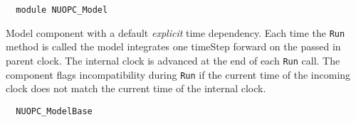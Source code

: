  
\setlength{\parskip}{0pt}
\setlength{\parindent}{0pt}
\setlength{\baselineskip}{11pt}
 
\def\bv{\begin{verbatim}}
\def\ev{\end{verbatim}}
\def\be{\begin{equation}}
\def\ee{\end{equation}}
\def\bea{\begin{eqnarray}}
\def\eea{\end{eqnarray}}
\def\bi{\begin{itemize}}
\def\ei{\end{itemize}}
\def\bn{\begin{enumerate}}
\def\en{\end{enumerate}}
\def\bd{\begin{description}}
\def\ed{\end{description}}
\def\({\left (}
\def\){\right )}
\def\[{\left [}
\def\]{\right ]}
\def\<{\left  \langle}
\def\>{\right \rangle}
\def\cI{{\cal I}}
\def\diag{\mathop{\rm diag}}
\def\tr{\mathop{\rm tr}}


\begin{verbatim}  module NUOPC_Model
\end{verbatim}

Model component with a default {\em explicit} time dependency. Each time the {\tt Run} method is called the model integrates one timeStep forward on the passed in parent clock. The internal clock is advanced at the end of each {\tt Run} call. The component flags incompatibility during {\tt Run} if the current time of the incoming clock does not match the current time of the internal clock.

\begin{verbatim}  NUOPC_ModelBase
\end{verbatim}

